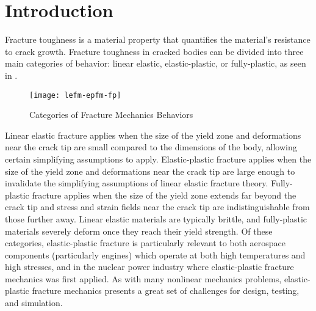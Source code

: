 \chapter{Introduction} \label{chap:intro}
Fracture toughness is a material property that quantifies the material's resistance to crack growth.
Fracture toughness in cracked bodies can be divided into three main categories of behavior: linear elastic, elastic-plastic, or fully-plastic, as seen in .
\begin{figure}[tbp]
\centering
\texttt{[image: lefm-epfm-fp]}
\caption[Categories of Fracture Mechanics Behaviors]{\label{fig:lefm-epfm-fp} Categories of Fracture Mechanics Behaviors \cite{janssenzuidemawanhill2002}}
\end{figure}
Linear elastic fracture applies when the size of the yield zone and deformations near the crack tip are small compared to the dimensions of the body, allowing certain simplifying assumptions to apply.
Elastic-plastic fracture applies when the size of the yield zone and deformations near the crack tip are large enough to invalidate the simplifying assumptions of linear elastic fracture theory.
Fully-plastic fracture applies when the size of the yield zone extends far beyond the crack tip and stress and strain fields near the crack tip are indistinguishable from those further away.
Linear elastic materials are typically brittle, and fully-plastic materials severely deform once they reach their yield strength.
Of these categories, elastic-plastic fracture is particularly relevant to both aerospace components (particularly engines)
which operate at both high temperatures and high stresses, and in the nuclear power industry where elastic-plastic fracture mechanics was first applied.
As with many nonlinear mechanics problems, elastic-plastic fracture mechanics presents a great set of challenges for design, testing, and simulation.

